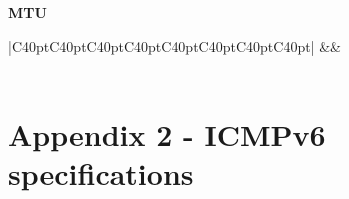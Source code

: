\documentclass[12pt]{article}
\begin{document}
\textbf{MTU}

\begin{savenotes}
\begin{table}[!htpb]
\centering
\begin{tabular}{|C{40pt}C{40pt}C{40pt}C{40pt}C{40pt}C{40pt}C{40pt}C{40pt}|}
\hline
{}&&\\
\hline
{}\\
\hline
\end{tabular}
\caption{MTU}
\label{table:optionsMTU}
\end{table}
\end{savenotes}



\pagebreak
\section{Appendix 2 - ICMPv6 specifications}
\label{Appendix 2}
\end{document}
